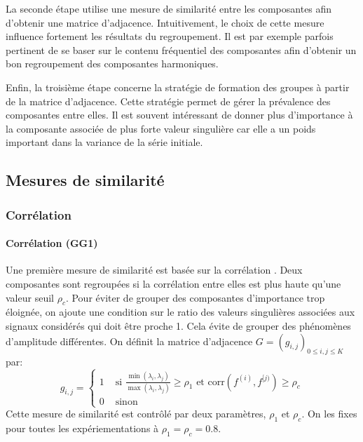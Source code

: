 \documentclass{gretsi}
\begin{document}
La seconde étape utilise une mesure de similarité entre les composantes afin d'obtenir une matrice d'adjacence. Intuitivement, le choix de cette mesure influence fortement les résultats du regroupement. Il est par exemple parfois pertinent de se  baser sur le contenu fréquentiel des composantes afin d'obtenir un bon regroupement des composantes harmoniques.

Enfin, la troisième étape concerne la stratégie de formation des groupes à partir de la matrice d'adjacence. Cette stratégie permet de gérer la prévalence des composantes entre elles. Il est souvent intéressant de donner plus d'importance à la composante associée de plus forte valeur singulière car elle a un poids important dans la variance de la série initiale.


\subsection{Mesures de similarité}
\label{sub:sim}

\subsubsection{Corrélation}\label{ssub:cor}
\paragraph{Corrélation (GG1)}\label{par:GG1}
    Une première mesure de similarité est basée sur la corrélation \cite{abalov_14_auto}. Deux composantes sont regroupées si la corrélation entre elles est plus haute qu'une valeur seuil $\rho_c$. Pour éviter de grouper des composantes d'importance trop éloignée, on ajoute une condition sur le ratio des valeurs singulières associées aux signaux considérés qui doit être proche 1. Cela évite de grouper des phénomènes d'amplitude différentes. On définit la matrice d'adjacence $G = (g_{i, j})_{0 \le i,j\le K}$ par:
    $$
    g_{i, j} = \begin{cases}
	    1 &\text{ si } \displaystyle\frac{\min(\lambda_i, \lambda_j)}{\max(\lambda_i, \lambda_j)} \ge \rho_1 \text{ et } \text{corr}(f^{(i)}, f^{[j)}) \ge \rho_c\\
	    0& \text{ sinon}
    \end{cases}
    $$Cette mesure de similarité est contrôlé par deux paramètres, $\rho_1$ et $\rho_c$. On les fixes pour toutes les expériementations à $\rho_1=\rho_c=0.8$.
\end{document}
